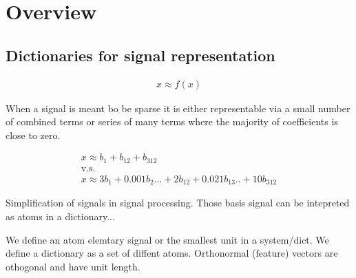 \chapter{Overview}
\thispagestyle{empty}

\section{Dictionaries for signal representation}


\begin{align*}
x \approx f\left(x\right)
\end{align*}


When a signal is meant bo be sparse it is either representable via a small number of combined terms or series of many terms where the majority of coefficients is
close to zero.

\begin{align*}
x \approx b_{1} + b_{12} + b_{312}\\
 \text{v.s.}\\ x \approx 3b_{1} + 0.001b_{2} ... + 2b_{12} + 0.021b_{13} .. + 10b_{312}
\end{align*}



Simplification of signals in signal processing.
Those basis signal can be intepreted as atoms in a dictionary...

We define an atom elemtary signal or the smallest unit in a system/dict.
We define a dictionary as a set of diffent atoms.
Orthonormal (feature) vectors are othogonal and have unit length.


